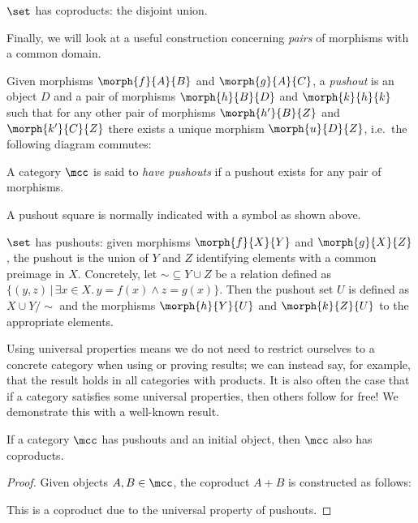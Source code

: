\begin{example}
    \(\set\) has coproducts: the disjoint union.
\end{example}

Finally, we will look at a useful construction concerning \emph{pairs} of
morphisms with a common domain.

\begin{definition}[Pushout]
    Given morphisms \(\morph{f}{A}{B}\) and \(\morph{g}{A}{C}\), a
    \emph{pushout} is an object \(D\) and a pair of morphisms
    \(\morph{h}{B}{D}\) and \(\morph{k}{h}{k}\) such that for any other pair of
    morphisms \(\morph{h^\prime}{B}{Z}\) and \(\morph{k^\prime}{C}{Z}\) there
    exists a unique morphism \(\morph{u}{D}{Z}\), i.e.\ the following diagram
    commutes:
    \begin{center}
        
    \end{center}
    A category \(\mcc\) is said to \emph{have pushouts} if a pushout exists for
    any pair of morphisms.
\end{definition}

A pushout square is normally indicated with a \raisebox{-0.25em}{\(\ulcorner\)}
symbol as shown above.

\begin{example}
    \(\set\) has pushouts: given morphisms \(\morph{f}{X}{Y}\) and
    \(\morph{g}{X}{Z}\), the pushout is the union of \(Y\) and \(Z\) identifying
    elements with a common preimage in \(X\).
    Concretely, let \({\sim} \subseteq Y \cup Z\) be a relation defined as
    \(\{(y, z) \,|\, \exists x \in X.\, y = f(x) \wedge z = g(x)\}\).
    Then the pushout set \(U\) is defined as \(X \cup Y / \sim\) and the
    morphisms \(\morph{h}{Y}{U}\) and \(\morph{k}{Z}{U}\) to the appropriate
    elements.
\end{example}

Using universal properties means we do not need to restrict ourselves to a
concrete category when using or proving results; we can instead say, for
example, that the result holds in all categories with products.
It is also often the case that if a category satisfies some universal
properties, then others follow for free!
We demonstrate this with a well-known result.

\begin{lemma}
    \label{lem:coproducts-pushout}
    If a category \(\mcc\) has pushouts and an initial object, then \(\mcc\)
    also has coproducts.
\end{lemma}
\begin{proof}
    Given objects \(A,B \in \mcc\), the coproduct \(A + B\) is constructed as
    follows:
    \begin{center}
    \end{center}
    This is a coproduct due to the universal property of pushouts.
\end{proof}
